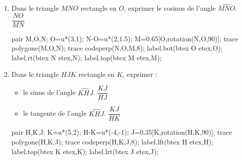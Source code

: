 \begin{corrige}
    \phantom{rrr}    

    \begin{enumerate}
        \item Dans le triangle $MNO$ rectangle en $O$, exprimer le cosinus de l'angle $\widehat{MNO}$. {\red $\dfrac{NO}{MN}$}
        
        \medskip
        \begin{Geometrie}[CoinHD={(6u,4.5u)}]        
            pair M,O,N;
            O=u*(3,1);
            N-O=u*(2,1.5);
            M=0.65[O,rotation(N,O,90)];
            trace polygone(M,O,N);            
            trace codeperp(N,O,M,8);
            label.bot(btex O etex,O);
            label.rt(btex N etex,N);
            label.top(btex M etex,M);
        \end{Geometrie}
        \item Dans le triangle $HJK$ rectangle en $K$, exprimer :
        \begin{itemize}
            \item le sinus de l'angle $\widehat{KHJ}$. {\red $\dfrac{KJ}{HJ}$}
            \item le tangente de l'angle $\widehat{KHJ}$. {\red $\dfrac{KJ}{HK}$}
        \end{itemize}
        
        \medskip
        \begin{Geometrie}[CoinHD={(6u,4.5u)}]        
            pair H,K,J;
            K=u*(5,2);
            H-K=u*(-4,-1);
            J=0.35[K,rotation(H,K,90)];
            trace polygone(H,K,J);            
            trace codeperp(H,K,J,8);
            label.lft(btex H etex,H);
            label.top(btex  K etex,K);
            label.lrt(btex J etex,J);
        \end{Geometrie}
    \end{enumerate}
\end{corrige}

